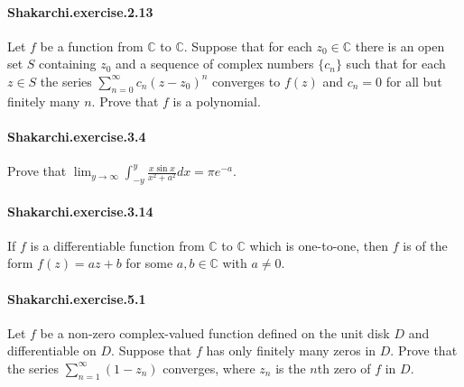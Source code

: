 \documentclass{article}
\begin{document}
\paragraph{Shakarchi.exercise.2.13} Let $f$ be a function from $\mathbb{C}$ to $\mathbb{C}$. Suppose that for each $z_0\in\mathbb{C}$ there is an open set $S$ containing $z_0$ and a sequence of complex numbers $\{c_n\}$ such that for each $z\in S$ the series $\sum_{n=0}^\infty c_n(z-z_0)^n$ converges to $f(z)$ and $c_n=0$ for all but finitely many $n$. Prove that $f$ is a polynomial.

\paragraph{Shakarchi.exercise.3.4} Prove that $\lim_{y\to\infty} \int_{-y}^y \frac{x\sin x}{x^2+a^2} dx = \pi e^{-a}$.

\paragraph{Shakarchi.exercise.3.14} If $f$ is a differentiable function from $\mathbb{C}$ to $\mathbb{C}$ which is one-to-one, then $f$ is of the form $f(z)=az+b$ for some $a, b\in\mathbb{C}$ with $a\neq 0$.

\paragraph{Shakarchi.exercise.5.1} Let $f$ be a non-zero complex-valued function defined on the unit disk $D$ and differentiable on $D$. Suppose that $f$ has only finitely many zeros in $D$. Prove that the series $\sum_{n=1}^\infty (1-z_n)$ converges, where $z_n$ is the $n$th zero of $f$ in $D$.
\end{document}
